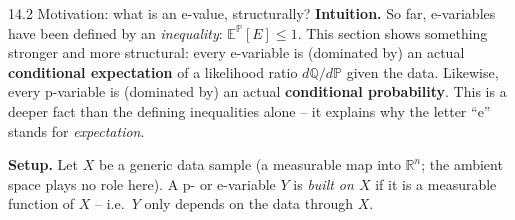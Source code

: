 \documentclass[aspectratio=169,10pt]{beamer}
\newcommand{\PP}{\mathbb{P}}
\newcommand{\QQ}{\mathbb{Q}}
\newcommand{\EE}{\mathbb{E}}
\newcommand{\RR}{\mathbb{R}}
\begin{document}
\begin{frame}{14.2 Motivation: what is an e-value, structurally?}
  \textbf{Intuition.} So far, e-variables have been defined by an
  \emph{inequality}: $\EE^{\PP}[E] \leq 1$. This section shows something
  stronger and more structural: every e-variable is (dominated by) an
  actual \textbf{conditional expectation} of a likelihood ratio
  $d\QQ/d\PP$ given the data. Likewise, every p-variable is (dominated by)
  an actual \textbf{conditional probability}. This is a deeper fact than
  the defining inequalities alone -- it explains why the letter ``e''
  stands for \emph{expectation}.

  \textbf{Setup.} Let $X$ be a generic data sample (a measurable map into
  $\RR^n$; the ambient space plays no role here). A p- or e-variable $Y$
  is \emph{built on $X$} if it is a measurable function of $X$ -- i.e.\
  $Y$ only depends on the data through $X$.
\end{frame}
\end{document}
